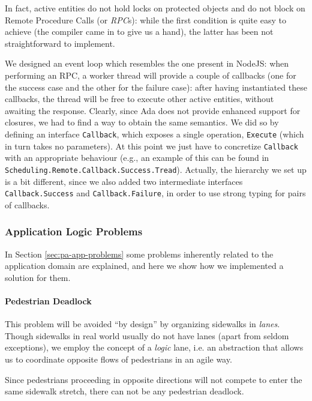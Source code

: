 In fact, active entities do not hold locks on protected objects and do not
block on Remote Procedure Calls (or \textit{RPC}s): while the first condition
is quite easy to achieve (the compiler came in to give us a hand), the latter
has been not straightforward to implement.

We designed an event loop which resembles the one present in NodeJS: when
performing an RPC, a worker thread will provide a couple of callbacks (one for
the success case and the other for the failure case): after having instantiated
these callbacks, the thread will be free to execute other active entities,
without awaiting the response.
Clearly, since Ada does not provide enhanced support for closures, we had to
find a way to obtain the same semantics. We did so by defining an interface
\texttt{Callback}, which exposes a single operation, \texttt{Execute} (which
in turn takes no parameters). At this point we just have to concretize
\texttt{Callback} with an appropriate behaviour (e.g., an example of this can
be found in \texttt{Scheduling.Remote.Callback.Success.Tread}).
Actually, the hierarchy we set up is a bit different, since we also added two
intermediate interfaces \texttt{Callback.Success} and
\texttt{Callback.Failure}, in order to use strong typing for pairs of
callbacks.


\subsubsection{Application Logic Problems}

In Section \ref{sec:pa-app-problems} some problems inherently related to the
application domain are explained, and here we show how we implemented a
solution for them.

\paragraph{Pedestrian Deadlock}
This problem will be avoided ``by design'' by organizing sidewalks in
\textit{lanes}. Though sidewalks in real world usually do not have lanes (apart
from seldom exceptions), we employ the concept of a \textit{logic} lane, i.e.
an abstraction that allows us to coordinate opposite flows of pedestrians in an
agile way.

Since pedestrians proceeding in opposite directions will not compete to enter
the same sidewalk stretch, there can not be any pedestrian deadlock.

